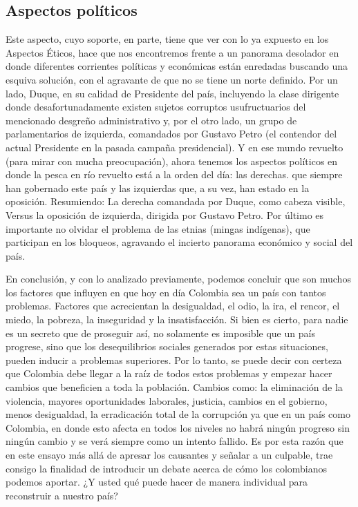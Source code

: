 \documentclass[doc, 12pt, letterpaper, donotrepeattitle, floatsintext, natbib]{apa7}
\begin{document}
\subsection{Aspectos políticos}
Este aspecto, cuyo soporte, en parte, tiene que ver con lo ya expuesto en los Aspectos Éticos, hace que nos encontremos frente a un panorama desolador en donde diferentes corrientes políticas y económicas están enredadas buscando una esquiva solución, con el agravante de que no se tiene un norte definido. Por un lado, Duque, en su calidad de Presidente del país, incluyendo la clase dirigente donde desafortunadamente existen sujetos corruptos usufructuarios del mencionado desgreño administrativo y, por el otro lado, un grupo de parlamentarios de izquierda, comandados por Gustavo Petro (el contendor del actual Presidente en la pasada campaña presidencial). Y en ese mundo revuelto (para mirar con mucha preocupación), ahora tenemos los aspectos políticos en donde la pesca en río revuelto está a la orden del día: las derechas. que siempre han gobernado este país y las izquierdas que, a su vez, han estado en la oposición. Resumiendo: La derecha comandada por Duque, como cabeza visible, Versus la oposición de izquierda, dirigida por Gustavo Petro. Por último es importante no olvidar el problema de las etnias (mingas indígenas), que participan en los bloqueos, agravando el incierto panorama económico y social del país.

En conclusión, y con lo analizado previamente, podemos concluir que son muchos los factores que influyen en que hoy en día Colombia sea un país con tantos problemas. Factores que acrecientan la desigualdad, el odio, la ira, el rencor, el miedo, la pobreza, la inseguridad y la insatisfacción. Si bien es cierto, para nadie es un secreto que de proseguir así, no solamente es imposible que un país progrese, sino que los desequilibrios sociales generados por estas situaciones, pueden inducir a problemas superiores. Por lo tanto, se puede decir con certeza que Colombia debe llegar a la raíz de todos estos problemas y empezar hacer cambios que beneficien a toda la población. Cambios como: la eliminación de la violencia, mayores oportunidades laborales, justicia, cambios en el gobierno, menos desigualdad, la erradicación total de la corrupción ya que en un país como Colombia, en donde esto afecta en todos los niveles no habrá ningún progreso sin ningún cambio y se verá siempre como un intento fallido. Es por esta razón que en este ensayo más allá de apresar los causantes y señalar a un culpable, trae consigo la finalidad de introducir un debate acerca de cómo los colombianos podemos aportar. ¿Y usted qué puede hacer de manera individual para reconstruir a nuestro país?


\newpage
\renewcommand\refname{\large\textbf{Referencias bibliográficas:}}

\end{document}
